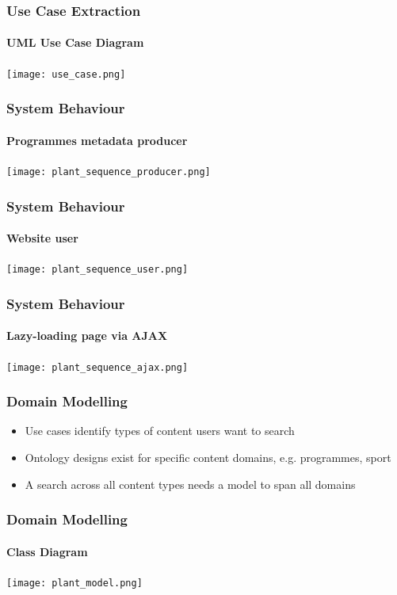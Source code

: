 \documentclass{beamer}
\begin{document}
\begin{frame}
  \frametitle{Use Case Extraction}
  \framesubtitle{UML Use Case Diagram}
  \texttt{[image: use\_case.png]}
\end{frame}

\begin{frame}
  \frametitle{System Behaviour}
  \framesubtitle{Programmes metadata producer}
  \texttt{[image: plant\_sequence\_producer.png]}
\end{frame}

\begin{frame}
  \frametitle{System Behaviour}
  \framesubtitle{Website user}
  \begin{center}
    \texttt{[image: plant\_sequence\_user.png]}
  \end{center}
\end{frame}

\begin{frame}
  \frametitle{System Behaviour}
  \framesubtitle{Lazy-loading page via AJAX}
  \begin{center}
    \texttt{[image: plant\_sequence\_ajax.png]}
  \end{center}
\end{frame}

\begin{frame}
  \frametitle{Domain Modelling}
  \begin{itemize}
    \item Use cases identify types of content users want to search
    \item Ontology designs exist for specific content domains, e.g. programmes, sport
    \item A search across all content types needs a model to span all domains
  \end{itemize}
\end{frame}

\begin{frame}
  \frametitle{Domain Modelling}
  \framesubtitle{Class Diagram}
  \begin{center}
    \pause \texttt{[image: plant\_model.png]}
  \end{center}
\end{frame}

\end{document}

